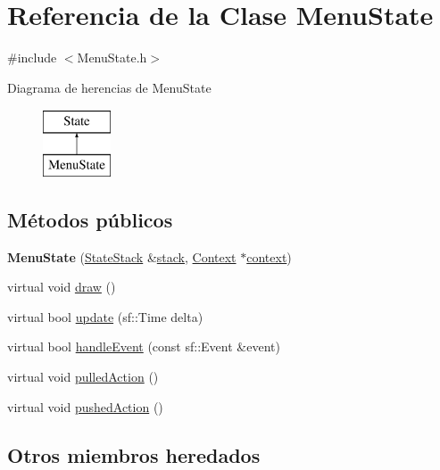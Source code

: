 \hypertarget{classMenuState}{}\section{Referencia de la Clase Menu\+State}
\label{classMenuState}


{\ttfamily \#include $<$Menu\+State.\+h$>$}

Diagrama de herencias de Menu\+State\begin{figure}[H]
\begin{center}
\leavevmode
\includegraphics[height=2.000000cm]{classMenuState}
\end{center}
\end{figure}
\subsection*{Métodos públicos}
\begin{DoxyCompactItemize}
\item 
\hypertarget{classMenuState_a1ad806f354ec6b688a3c7b1bfcda9846}{}{\bfseries Menu\+State} (\hyperlink{classStateStack}{State\+Stack} \&\hyperlink{classState_a86c8d3a5a1ee89896828be85a785fb04}{stack}, \hyperlink{classContext}{Context} $\ast$\hyperlink{classState_adc93e8ad3199b5891618ca88eed0436a}{context})\label{classMenuState_a1ad806f354ec6b688a3c7b1bfcda9846}

\item 
virtual void \hyperlink{classMenuState_aa557d6c3bf06bb3107ed780913a6b47f}{draw} ()
\item 
virtual bool \hyperlink{classMenuState_a24362f4096e0f76e02a7d1b26ac657af}{update} (sf\+::\+Time delta)
\item 
virtual bool \hyperlink{classMenuState_a04a21241cebf6a8f0fe8ee9ce895ef18}{handle\+Event} (const sf\+::\+Event \&event)
\item 
virtual void \hyperlink{classMenuState_aa465ec731c1ab2b63a54ce5c59092ea3}{pulled\+Action} ()
\item 
virtual void \hyperlink{classMenuState_a74beed2b1d43948dd7ab1b8262519df6}{pushed\+Action} ()
\end{DoxyCompactItemize}
\subsection*{Otros miembros heredados}


